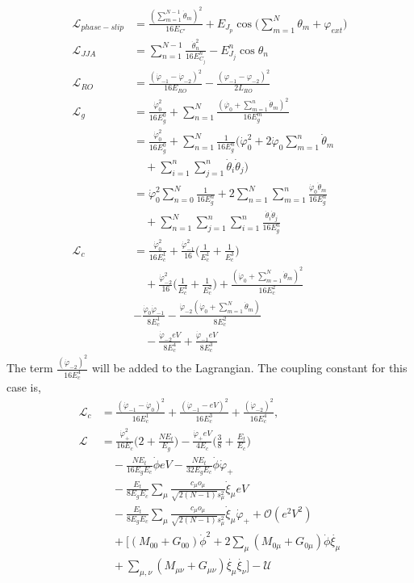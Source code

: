 \documentclass[prx,showpacs,notitlepage,twocolumn,superscriptaddress,nofootinbib,preprintnumbers,floatfix]{revtex4-2}
\begin{document}
  \begin{align}
    \mathcal{L}_{phase-slip}&=\frac{(\sum_{m=1}^{N-1}\dot\theta_m)^2}{16E_{C'}}+E_{J_p}\cos\big(\sum_{m=1}^N\theta_m+\varphi_{ext}\big)\\
    \mathcal{L}_{JJA}&=\sum_{n=1}^{N-1}\frac{\dot{\theta}_n^2}{16E^{n}_{C_j}}-E^{n}_{J_j}\cos{\theta_n}\\
    \mathcal{L}_{RO}&=\frac{(\dot{\varphi}_{-1}-\dot{\varphi}_{-2})^2}{16E_{{RO}}}-\frac{(\varphi_{-1}-\varphi_{-2})^2}{2L_{RO}}\\
    \mathcal{L}_{g}&=\frac{\dot{\varphi}_0^2}{16E^0_{g}}+\sum_{n=1}^N \frac{(\dot{\varphi_0}+\sum_{m=1}^n\dot{\theta}_m)^2}{16E^m_{g}}\\
    &=\frac{\dot{\varphi}_0^2}{16E^0_{g}}+\sum_{n=1}^N \frac{1}{16E^n_{g}}(\dot{\varphi}_0^2+2\dot{\varphi}_0\sum_{m=1}^n\dot{\theta}_m\nonumber\\&\quad+\sum_{i=1}^n\sum_{j=1}^{n}\dot{\theta}_i\dot{\theta}_j)\\
    &=\dot{\varphi}_0^2\sum_{n=0}^N\frac{1}{16E^n_g}+2\sum_{n=1}^N\sum_{m=1}^n\frac{\dot{\varphi}_0\dot{\theta}_m}{16E^n_{g}}\nonumber\\&\quad+\sum_{n=1}^N\sum_{j=1}^n\sum_{i=1}^{n}\frac{\dot{\theta}_i\dot{\theta}_j}{16E^n_{g}}\\
    \mathcal{L}_{c}&=\frac{\dot{\varphi}^2_0}{16E^1_c}+\frac{\dot{\varphi}^2_{-1}}{16}\Big(\frac{1}{E^1_c}+\frac{1}{E^3_c}\Big)\nonumber\\
    &\quad+\frac{\dot{\varphi}^2_{-2}}{16}\Big(\frac{1}{E^4_c}+\frac{1}{E^2_c}\Big)+\frac{(\dot{\varphi}_0+\sum_{m=1}^N\dot{\theta}_m)^2}{16E^2_c}\nonumber\\
  &-\frac{\dot{\varphi}_0\dot{\varphi}_{-1}}{8E^1_c}-\frac{\dot{\varphi}_{-2}(\dot{\varphi}_{0}+\sum_{m=1}^N\dot{\theta}_m)}{8E^2_c}\nonumber\\
    &\quad-\frac{\dot{\varphi}_{-2}eV}{8E^4_c}+\frac{\dot{\varphi}_{-1}eV}{8E^3_c}
\end{align}
The term $\frac{(\dot{\varphi}_{-2})^2}{16E^4_{c}}$ will be added to the Lagrangian. The coupling constant for this case is,
\begin{align}
    \mathcal{L}_{c}&=\frac{(\dot{\varphi}_{-1}-\dot{\varphi}_{0})^2}{16E^1_{c}}+\frac{(\dot{\varphi}_{-1}-eV)^2}{16E^3_{c}}+\frac{(\dot{\varphi}_{-2})^2}{16E^4_{c}},\\
 \mathcal{L}&=\frac{\dot{\varphi}_{+}^2}{16E_c}\Big(2+\frac{NE_t}{E_g}\Big)-\frac{\dot{\varphi}_{+}eV}{4E_c}\Big(\frac{3}{8}+\frac{E_t}{E_c}\Big)\nonumber\\
    &\quad-\frac{NE_t}{16E_gE_c}\dot{\phi}eV-\frac{NE_t}{32E_gE_c}\dot{\phi}\dot{\varphi}_{+}\\
    &\quad -\frac{E_t}{8E_gE_c} \sum_\mu\frac{c_\mu o_\mu}{\sqrt{2(N-1)}s_\mu^2}  \dot{\xi}_\mu eV\nonumber\\
    &\quad-\frac{E_t}{8E_gE_c} \sum_\mu\frac{c_\mu o_\mu}{\sqrt{2(N-1)}s_\mu^2}  \dot{\xi}_\mu\dot{\varphi}_{+}+\mathcal{O}(e^2V^2)\\
    &\quad+\Big[(M_{00}+G_{00})\dot{\phi}^2+2\sum_{\mu}(M_{0\mu}+G_{0\mu})\dot{\phi}\dot{\xi_\mu}\nonumber\\
    &\quad+\sum_{\mu,\nu}(M_{\mu\nu}+G_{\mu\nu})\dot{\xi_\mu}\dot{\xi_\nu}\Big]-\mathcal{U}
\end{align}
\end{document}
